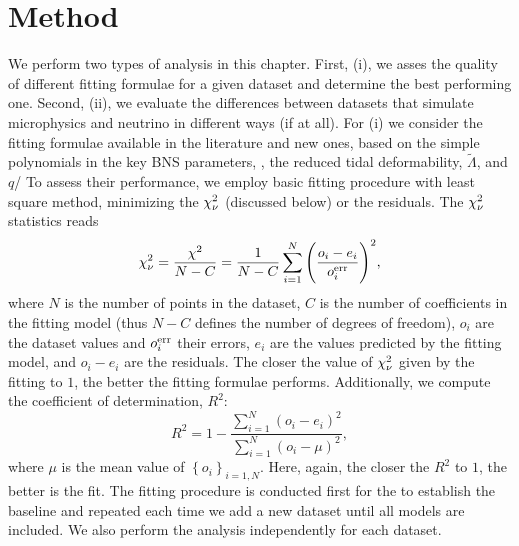 

\section{Method}

We perform two types of analysis in this chapter.
First, (i), we asses the quality of different fitting formulae for a given
dataset and determine the best performing one.
Second, (ii), we evaluate the differences between datasets that 
simulate microphysics and neutrino in different ways (if at all).
%
For (i) we consider the fitting formulae available in the literature 
and new ones, based on the simple polynomials in the key \ac{BNS} parameters, 
\ie, the reduced tidal deformability, $\tilde{\Lambda}$, and \mr{} $q$/
%
To assess their performance, we employ basic fitting procedure with least
square method, minimizing the $\chi_{\nu}^2$ (discussed below) or the residuals.
The $\chi_{\nu}^2$ statistics reads
%
\begin{equation}
\chi_{\nu}^{2} = \frac{\chi^2}{N - C} = \frac{1}{N-C}\sum\limits_{i=1}^{N}\Bigg(\frac{o_i - e_i}{o_i ^{\rm err}}\Bigg)^2,
\label{eq:theory:chi2dof}
\end{equation}
%
where $N$ is the number of points in the dataset, $C$ is the number of coefficients 
in the fitting model (thus $N-C$ defines the number of degrees of freedom),
$o_i$ are the dataset values and $o_i ^{\rm err}$ their errors,
$e_i$ are the values predicted by the fitting model, and 
$o_i - e_i$ are the residuals.
%
The closer the value of $\chi_{\nu}^2$ given by the fitting to $1$, the better the fitting 
formulae performs.
%
Additionally, we compute the coefficient of determination, $R^2$:
%
\begin{equation}
R^2 = 1 - \frac{\sum\limits_{i=1}^{N}(o_i - e_i)^2}{\sum\limits_{i=1}^{N}(o_i - \mu)^2},
\end{equation}
%
where $\mu$ is the mean value of $\left\{ o_i \right\}_{i=1,N}$.
%
Here, again, the closer the $R^2$ to $1$, the better is the fit. 
%
The fitting procedure is conducted first for the \DSrefset{} to establish
the baseline and repeated each time we add a new dataset until all models are included.
%
We also perform the analysis independently for each dataset.
%

